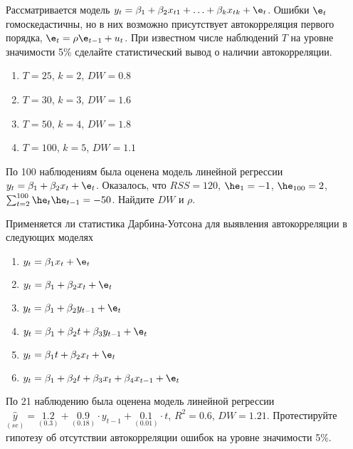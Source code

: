 \begin{problem}
Рассматривается модель $y_t=\beta_1+\beta_2 x_{t1}+\ldots+\beta_k x_{tk}+\e_t$. Ошибки $\e_t$ гомоскедастичны, но в них возможно присутствует автокорреляция первого порядка, $\e_t=\rho \e_{t-1}+u_t$. При известном числе наблюдений $T$ на уровне значимости 5\% сделайте статистический вывод о наличии автокорреляции.
\begin{enumerate}
\item $T=25$, $k=2$, $DW=0.8$
\item $T=30$, $k=3$, $DW=1.6$
\item $T=50$, $k=4$, $DW=1.8$
\item $T=100$, $k=5$, $DW=1.1$
\end{enumerate}
\end{problem}

\begin{solution}
\end{solution}


\begin{problem}
По 100 наблюдениям была оценена модель линейной регрессии
$y_t=\beta_1+\beta_2 x_t+\e_t$. Оказалось, что $RSS=120$, $\he_1=-1$, $\he_{100}=2$, $\sum_{t=2}^{100} \he_t\he_{t-1}=-50$. Найдите $DW$ и $\rho$.
\end{problem}

\begin{solution}
\end{solution}


\begin{problem}
Применяется ли статистика Дарбина-Уотсона для выявления автокорреляции в следующих моделях
\begin{enumerate}
\item $y_t=\beta_1 x_t + \e_t$
\item $y_t=\beta_1 + \beta_2 x_t + \e_t$
\item $y_t=\beta_1 + \beta_2 y_{t-1} + \e_t$
\item $y_t=\beta_1 + \beta_2 t +\beta_3 y_{t-1} + \e_t$
\item $y_t=\beta_1 t + \beta_2 x_t + \e_t$
\item $y_t=\beta_1 + \beta_2 t +\beta_3 x_t +\beta_4 x_{t-1} + \e_t$
\end{enumerate}
\end{problem}

\begin{solution}
\end{solution}


\begin{problem}
По 21 наблюдению была оценена модель линейной регрессии
$\underset{(se)}{\hat{y}}=\underset{(0.3)}{1.2}+\underset{(0.18)}{0.9}\cdot y_{t-1}+\underset{(0.01)}{0.1}\cdot t$, $R^2=0.6$, $DW=1.21$. Протестируйте гипотезу об отсутствии автокорреляции ошибок на уровне значимости 5\%.
\end{problem}

